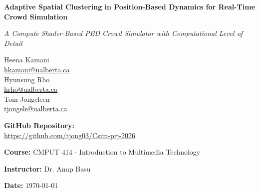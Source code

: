 \documentclass{CSIM}
\begin{document}
\begin{titlepage}
    \centering
    \vspace*{2cm}
    
    {\Huge \bfseries Adaptive Spatial Clustering in Position-Based Dynamics for Real-Time Crowd Simulation \par}
    \vspace{0.75cm}
    
    {\Large \textit{A Compute Shader-Based PBD Crowd Simulator with Computational Level of Detail} \par}
    
    \vspace{2.5cm}
    
    {
    Heena Kamani \\ \href{mailto:hkamani@ualberta.ca}{hkamani@ualberta.ca} \\[0.5cm]
    Hyunsung Rho \\ \href{mailto:hrho@ualberta.ca}{hrho@ualberta.ca} \\[0.5cm]
    Tom Jongeleen \\ \href{mailto:tjongele@ualberta.ca}{tjongele@ualberta.ca} \par
    }
    
    \vspace{1.5cm}
    
    {\small \textbf{GitHub Repository:}} \\
    {\small \url{https://github.com/tjong03/Csim-prj-2026}} \par
    
    \vspace{2.0cm}
    
    {\large \textbf{Course:} CMPUT 414 - Introduction to Multimedia Technology\par}
    \vspace{0.5cm}
    {\large \textbf{Instructor:} Dr. Anup Basu \par}
    \vspace{0.5cm}
    {\large \textbf{Date:} \today \par} %
    
    \vfill
\end{titlepage}











\newpage
\renewcommand\refname{References Cited}





\end{document}

